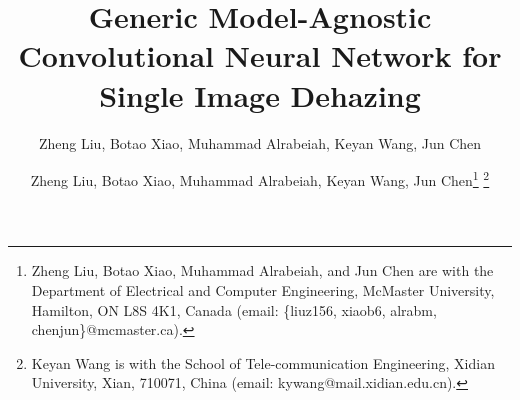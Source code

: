 \documentclass[journal]{IEEEtran}
\begin{document}
%
\title{Generic Model-Agnostic Convolutional Neural Network for Single Image Dehazing}
%
%
%

\author{Zheng Liu,
		Botao Xiao,
		Muhammad Alrabeiah,
		Keyan Wang,
        Jun Chen
}

%
\author{Zheng Liu, Botao Xiao, Muhammad Alrabeiah, Keyan Wang, Jun Chen\thanks{ Zheng Liu, Botao Xiao, Muhammad Alrabeiah, and Jun Chen are with the Department of Electrical and Computer Engineering, McMaster University, Hamilton, ON L8S 4K1, Canada (email: \{liuz156, xiaob6, alrabm, chenjun\}@mcmaster.ca).} \thanks{Keyan Wang is with the School of Tele-communication Engineering, Xidian University, Xian, 710071, China (email: kywang@mail.xidian.edu.cn).}}
%
\end{document}
